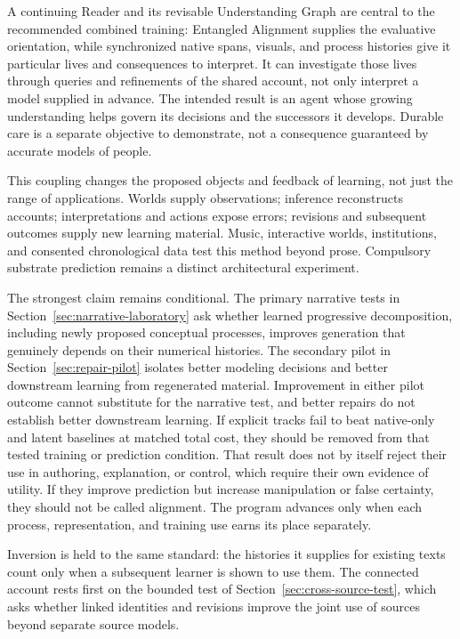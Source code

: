 \documentclass[10pt]{article}
\begin{document}
A continuing Reader and its revisable Understanding Graph
are central to the recommended combined training: Entangled Alignment supplies
the evaluative orientation, while synchronized native spans, visuals, and
process histories give it particular lives and consequences to interpret.
It can investigate those lives through queries and refinements of the shared
account, not only interpret a model supplied in advance.
The intended result is an agent whose growing understanding helps govern its
decisions and the successors it develops. Durable care is a separate objective
to demonstrate, not a consequence guaranteed by accurate models of people.

This coupling changes the proposed objects and feedback of learning, not just
the range of applications. Worlds supply observations; inference reconstructs
accounts; interpretations and actions expose errors; revisions and subsequent
outcomes supply new learning material. Music, interactive worlds, institutions,
and consented chronological data test this method beyond prose. Compulsory
substrate prediction remains a distinct architectural experiment.

The strongest claim remains conditional. The primary narrative tests in
Section~\ref{sec:narrative-laboratory} ask whether learned progressive
decomposition, including newly proposed conceptual processes, improves
generation that genuinely depends on their numerical histories. The secondary
pilot in Section~\ref{sec:repair-pilot} isolates better modeling decisions and
better downstream learning from regenerated material. Improvement in either
pilot outcome cannot substitute for the narrative test, and better repairs
do not establish better downstream learning. If explicit tracks fail to beat
native-only and latent baselines at matched total cost, they should be removed
from that tested training or prediction condition. That result does not by
itself reject their use in authoring, explanation, or control, which require
their own evidence of utility.
If they improve prediction but increase manipulation or false certainty, they
should not be called alignment. The program advances only when each process,
representation, and training use earns its place separately.

Inversion is held to the same standard: the histories it supplies for existing texts
count only when a subsequent learner is shown to use them. The connected account
rests first on the bounded test of Section~\ref{sec:cross-source-test}, which asks
whether linked identities and revisions improve the joint use of sources beyond
separate source models.
\end{document}
